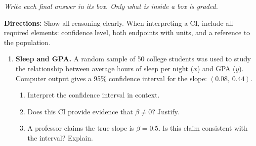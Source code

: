 \documentclass[10pt]{article}
\begin{document}
{\small\itshape Write each final answer in its box. Only what is inside a box is graded.}\par

\vspace{0.1in}
\textbf{Directions:} Show all reasoning clearly. When interpreting a CI, include all
required elements: confidence level, both endpoints with units, and a reference to the
population.

\begin{enumerate}

  \boxguard[15]
  \item \textbf{Sleep and GPA.} A random sample of 50 college students was used to study
        the relationship between average hours of sleep per night ($x$) and GPA ($y$).
        Computer output gives a 95\% confidence interval for the slope: $(0.08,\ 0.44)$.

        \begin{enumerate}[label=\alph*.]

          \boxguard[15]
          \item Interpret the confidence interval in context.


          \boxguard[15]
          \item Does this CI provide evidence that $\beta \ne 0$? Justify.


          \boxguard[15]
          \item A professor claims the true slope is $\beta = 0.5$.
                Is this claim consistent with the interval? Explain.



\end{enumerate}
\end{enumerate}
\end{document}
